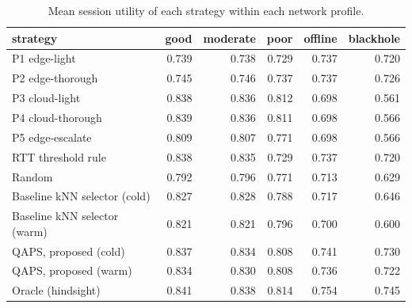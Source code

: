 \begin{table}[htbp]
\centering
\small
\caption{Mean session utility of each strategy within each network profile.}
\label{tab:dynamic_by_profile}
\begin{tabular}{l r r r r r}
\toprule
strategy & good & moderate & poor & offline & blackhole \\
\midrule
P1 edge-light & 0.739 & 0.738 & 0.729 & 0.737 & 0.720 \\
P2 edge-thorough & 0.745 & 0.746 & 0.737 & 0.737 & 0.726 \\
P3 cloud-light & 0.838 & 0.836 & 0.812 & 0.698 & 0.561 \\
P4 cloud-thorough & 0.839 & 0.836 & 0.811 & 0.698 & 0.566 \\
P5 edge-escalate & 0.809 & 0.807 & 0.771 & 0.698 & 0.566 \\
RTT threshold rule & 0.838 & 0.835 & 0.729 & 0.737 & 0.720 \\
Random & 0.792 & 0.796 & 0.771 & 0.713 & 0.629 \\
Baseline kNN selector (cold) & 0.827 & 0.828 & 0.788 & 0.717 & 0.646 \\
Baseline kNN selector (warm) & 0.821 & 0.821 & 0.796 & 0.700 & 0.600 \\
QAPS, proposed (cold) & 0.837 & 0.834 & 0.808 & 0.741 & 0.730 \\
QAPS, proposed (warm) & 0.834 & 0.830 & 0.808 & 0.736 & 0.722 \\
Oracle (hindsight) & 0.841 & 0.838 & 0.814 & 0.754 & 0.745 \\
\bottomrule
\end{tabular}
\end{table}
